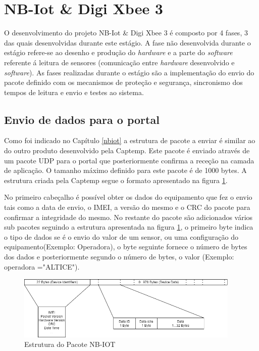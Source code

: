 \section {NB-Iot \& Digi Xbee 3 }
\par
O desenvolvimento do projeto NB-Iot \& Digi Xbee 3 é composto por 4 fases, 3 das quais desenvolvidas durante este estágio. A fase não desenvolvida durante o estágio refere-se ao desenho e produção do \textit{hardware} e a parte do \textit{software} referente á leitura de sensores (comunicação entre \textit{hardware} desenvolvido e \textit{software}). As fases realizadas durante o estágio são a implementação do envio do pacote definido com os mecanismos de proteção e segurança, sincronismo dos tempos de leitura e envio e testes ao sistema.

\subsection {Envio de dados para o portal}

\par Como foi indicado no Capítulo \ref{nbiot} a estrutura de pacote a enviar é similar ao do outro produto desenvolvido pela Captemp. Este pacote é enviado através de um pacote UDP para o portal que posteriormente confirma a receção na camada de aplicação. O tamanho máximo definido para este pacote é de 1000 bytes.
A estrutura criada pela Captemp segue o formato apresentado na figura \ref{packet}.
\par No primeiro cabeçalho é possível obter os dados do equipamento que fez o envio tais como a data de envio, o IMEI, a versão do mesmo e o CRC do pacote para confirmar a integridade do mesmo. No restante do pacote são adicionados vários sub pacotes seguindo a estrutura apresentada na figura \ref {packet}, o primeiro byte indica o tipo de dados se é o envio do valor de um sensor, ou  uma configuração do equipamento(Exemplo: Operadora), o byte seguinte fornece o número de bytes dos dados e posteriormente segundo o número de bytes, o valor (Exemplo: operadora ="ALTICE").

\begin{figure}[ht]
\centering
\includegraphics[width=0.95\textwidth]{images/packetnb.png}
\caption{Estrutura do Pacote NB-IOT}\label{packet}
\end{figure}

